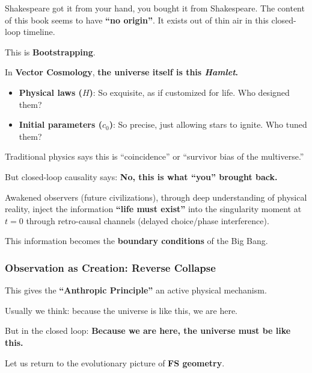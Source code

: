 Shakespeare got it from your hand, you bought it from Shakespeare. The content of this book seems to have \textbf{``no origin''}. It exists out of thin air in this closed-loop timeline.

This is \textbf{Bootstrapping}.

In \textbf{Vector Cosmology}, \textbf{the universe itself is this \textit{Hamlet}.}

\begin{itemize}
\item \textbf{Physical laws ($H$)}: So exquisite, as if customized for life. Who designed them?

\item \textbf{Initial parameters ($c_0$)}: So precise, just allowing stars to ignite. Who tuned them?
\end{itemize}

Traditional physics says this is ``coincidence'' or ``survivor bias of the multiverse.''

But closed-loop causality says: \textbf{No, this is what ``you'' brought back.}

Awakened observers (future civilizations), through deep understanding of physical reality, inject the information \textbf{``life must exist''} into the singularity moment at $t=0$ through retro-causal channels (delayed choice/phase interference).

This information becomes the \textbf{boundary conditions} of the Big Bang.

\subsubsection{Observation as Creation: Reverse Collapse}

This gives the \textbf{``Anthropic Principle''} an active physical mechanism.

Usually we think: because the universe is like this, we are here.

But in the closed loop: \textbf{Because we are here, the universe must be like this.}

Let us return to the evolutionary picture of \textbf{FS geometry}.

